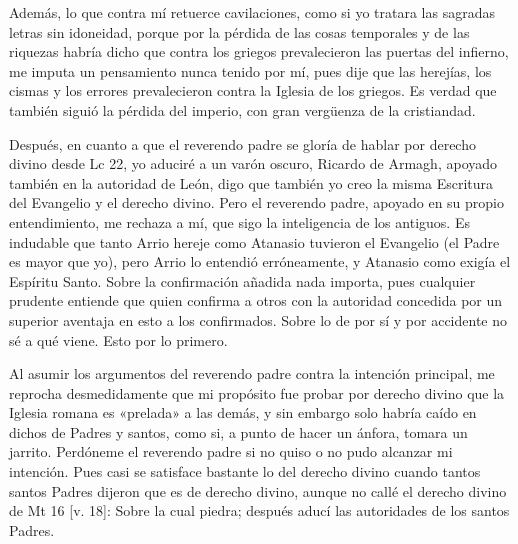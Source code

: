 Además, lo que contra mí retuerce cavilaciones, como si yo tratara las sagradas letras sin idoneidad, porque por la pérdida de las cosas temporales y de las riquezas habría dicho que contra los griegos prevalecieron las puertas del infierno, me imputa un pensamiento nunca tenido por mí, pues dije que las herejías, los cismas y los errores prevalecieron contra la Iglesia de los griegos. Es verdad que también siguió la pérdida del imperio, con gran vergüenza de la cristiandad.

Después, en cuanto a que el reverendo padre se gloría de hablar por derecho divino desde Lc 22, yo aduciré a un varón oscuro, Ricardo de Armagh, apoyado también en la autoridad de León, digo que también yo creo la misma Escritura del Evangelio y el derecho divino. Pero el reverendo padre, apoyado en su propio entendimiento, me rechaza a mí, que sigo la inteligencia de los antiguos. Es indudable que tanto Arrio hereje como Atanasio tuvieron el Evangelio (el Padre es mayor que yo), pero Arrio lo entendió erróneamente, y Atanasio como exigía el Espíritu Santo. Sobre la confirmación añadida nada importa, pues cualquier prudente entiende que quien confirma a otros con la autoridad concedida por un superior aventaja en esto a los confirmados. Sobre lo de por sí y por accidente no sé a qué viene. Esto por lo primero.

Al asumir los argumentos del reverendo padre contra la intención principal, me reprocha desmedidamente que mi propósito fue probar por derecho divino que la Iglesia romana es «prelada» a las demás, y sin embargo solo habría caído en dichos de Padres y santos, como si, a punto de hacer un ánfora, tomara un jarrito. Perdóneme el reverendo padre si no quiso o no pudo alcanzar mi intención. Pues casi se satisface bastante lo del derecho divino cuando tantos santos Padres dijeron que es de derecho divino, aunque no callé el derecho divino de Mt 16 [v. 18]: Sobre la cual piedra; después aducí las autoridades de los santos Padres.

